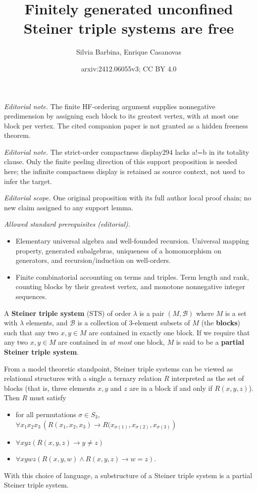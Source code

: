 \documentclass[10pt,a4paper]{article}
\title{Finitely generated unconfined Steiner triple systems are free}
\author{Silvia Barbina, Enrique Casanovas}
\date{arxiv:2412.06055v3; CC BY 4.0}
\theoremstyle{note}
\begin{document}
\maketitle
\noindent\textit{Editorial note.} The finite HF-ordering argument supplies nonnegative predimension by assigning each block to its greatest vertex, with at most one block per vertex. The cited companion paper is not granted as a hidden freeness theorem.\par\medskip
\noindent\textit{Editorial note.} The strict-order compactness display294 lacks a!=b in its totality clause. Only the finite peeling direction of this support proposition is needed here; the infinite compactness display is retained as source context, not used to infer the target.\par\medskip
\noindent\textit{Editorial scope.} One original proposition with its full author local proof chain; no new claim assigned to any support lemma.\par\medskip
\noindent\textit{Allowed standard prerequisites (editorial).}\begin{itemize}
\item Elementary universal algebra and well-founded recursion. Universal mapping property, generated subalgebras, uniqueness of a homomorphism on generators, and recursion/induction on well-orders.
\item Finite combinatorial accounting on terms and triples. Term length and rank, counting blocks by their greatest vertex, and monotone nonnegative integer sequences.
\end{itemize}\medskip
A \textbf{Steiner triple system} (STS) of order $\lambda$ is a pair $(M, \mathcal{B})$ where $M$ is a set with $\lambda$ elements, and 
 $\mathcal{B}$ is a collection of 3-element subsets of $M$ (the \textbf{blocks})
such that any two $x, y \in M$ are contained in exactly one block. If we require that any two $x,y \in M$ are contained in \textit{at most }one block, $M$ is said to be a  \textbf{partial Steiner triple system}.

From a model theoretic standpoint, Steiner triple systems can be viewed as relational structures with a single a ternary relation $R$ interpreted as the set of blocks (that is, three elements $x, y$ and $z$ are in a block if and only if $R(x,y,z)$). Then $R$ must satisfy
\begin{itemize}
\item for all permutations $\sigma \in S_3$, $ \forall x_1 x_2 x_3 \, \left(R(x_1, x_2, x_3) \rightarrow R(x_{\sigma(1)}, x_{\sigma(2)}, x_{\sigma(3)} \right)$
\item $\forall x y z \left( R(x,y,z) \rightarrow y\neq z \right)$
\item $\forall x y w z \left( R(x,y,w) \wedge R(x,y,z) \rightarrow w=z \right)$.
\end{itemize}
With this choice of language, a substructure of a Steiner triple system is a partial Steiner triple system.
\end{document}
